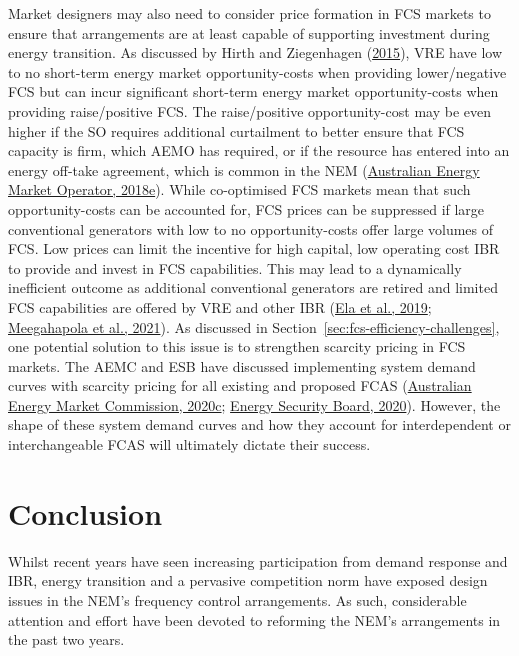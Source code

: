 \documentclass[12pt,a4paper,]{report}
\begin{document}
Market designers may also need to consider price formation in FCS
markets to ensure that arrangements are at least capable of supporting
investment during energy transition. As discussed by Hirth and
Ziegenhagen
(\protect\hyperlink{ref-hirthBalancingPowerVariable2015}{2015}), VRE
have low to no short-term energy market opportunity-costs when providing
lower/negative FCS but can incur significant short-term energy market
opportunity-costs when providing raise/positive FCS. The raise/positive
opportunity-cost may be even higher if the SO requires additional
curtailment to better ensure that FCS capacity is firm, which AEMO has
required, or if the resource has entered into an energy off-take
agreement, which is common in the NEM
(\protect\hyperlink{ref-australianenergymarketoperatorHornsdaleWindFarm2018}{Australian
Energy Market Operator, 2018e}). While co-optimised FCS markets mean
that such opportunity-costs can be accounted for, FCS prices can be
suppressed if large conventional generators with low to no
opportunity-costs offer large volumes of FCS. Low prices can limit the
incentive for high capital, low operating cost IBR to provide and invest
in FCS capabilities. This may lead to a dynamically inefficient outcome
as additional conventional generators are retired and limited FCS
capabilities are offered by VRE and other IBR
(\protect\hyperlink{ref-elaFutureElectricityMarkets2019}{Ela et al.,
2019};
\protect\hyperlink{ref-meegahapolaPowerSystemStability2021}{Meegahapola
et al., 2021}). As discussed in
Section~\ref{sec:fcs-efficiency-challenges}, one potential solution to
this issue is to strengthen scarcity pricing in FCS markets. The AEMC
and ESB have discussed implementing system demand curves with scarcity
pricing for all existing and proposed FCAS
(\protect\hyperlink{ref-australianenergymarketcommissionFrequencyControlRule2020}{Australian
Energy Market Commission, 2020c};
\protect\hyperlink{ref-energysecurityboardPost2025Market2020}{Energy
Security Board, 2020}). However, the shape of these system demand curves
and how they account for interdependent or interchangeable FCAS will
ultimately dictate their success.

\hypertarget{conclusion-1}{%
\section{Conclusion}\label{conclusion-1}}

Whilst recent years have seen increasing participation from demand
response and IBR, energy transition and a pervasive competition norm
have exposed design issues in the NEM's frequency control arrangements.
As such, considerable attention and effort have been devoted to
reforming the NEM's arrangements in the past two years.
\end{document}
